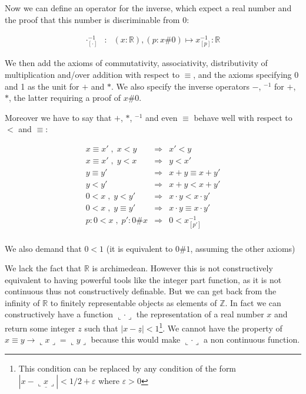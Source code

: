 \documentclass[a4paper,11pt]{article}
\newcommand{\R}{\mathbb{R}}
\newcommand{\Z}{\mathbb{Z}}
\theoremstyle{definition}
\theoremstyle{remark}
\begin{document}
Now we can define an operator for the inverse, which expect a real number and the
proof that this number is discriminable from 0:

  \[
  \begin{array}{ccl}
  \cdot^{-1}_{[\cdot]} & : & (x:\R), (p:x\#0) \mapsto x^{-1}_{[p]} : \R
  \end{array}
  \]

We then add the axioms of commutativity, associativity, distributivity of multiplication and/over
addition with respect to $≡$, and the axioms specifying 0 and 1 as the unit for $+$ and $*$. We also specify the inverse operators $-$, $^{-1}$ for $+$, $*$, the latter requiring a proof of $x\#0$.

Moreover we have to say that $+$, $*$, $^{-1}$ and even $≡$ behave well with respect to $<$ and $≡$:

  \[
  \begin{array}{rcl}
  x \equiv x' \;,\; x < y   &  \Rightarrow  & x' < y \\
  x \equiv x' \;,\; y < x   &  \Rightarrow  & y < x' \\
  y \equiv y'               &  \Rightarrow  & x + y \equiv x + y' \\
  y < y'                    &  \Rightarrow  & x + y < x + y' \\
  0 < x \;,\; y < y'        &  \Rightarrow  & x \cdot y < x \cdot y' \\
  0 < x \;,\; y \equiv y'   &  \Rightarrow  & x \cdot y \equiv x \cdot y' \\
  p:0<x \;,\;  p':0\#x      &  \Rightarrow  & 0 < x^{-1}_{[p']} \\
  \end{array}
  \]

We also demand that $0<1$ (it is equivalent to $0\#1$, assuming the other axioms)

We lack the fact that $\R$ is archimedean. However this is not constructively equivalent to having powerful tools like the integer part function, as it is not continuous thus not constructively definable. But we can get back from the infinity of $\R$ to finitely representable objects as elements of $\Z$. In fact we can constructively have a function $\llcorner \cdot \lrcorner$ the representation of a real number $x$ and return some integer $z$ such that $| x-\underline z | < 1$\footnote{This condition can be replaced by any condition of the form $| x-\underline {\llcorner x \lrcorner} | < 1/2+\varepsilon$ where $\varepsilon>0$}. We cannot have the property of $x≡y → \llcorner x \lrcorner=\llcorner y \lrcorner$ because this would make $\llcorner \cdot \lrcorner$ a non continuous function.
\end{document}
